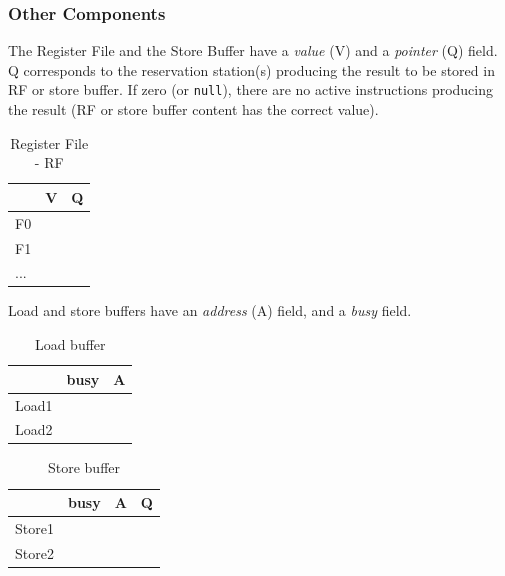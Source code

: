 \subsubsection{Other Components}
The Register File and the Store Buffer have a \textit{value} (V) and a \textit{pointer}
(Q) field.\\
Q corresponds to the reservation station(s) producing the result to be stored in RF or store buffer.
If zero (or \verb|null|), there are no active instructions producing the result (RF or store buffer content has the
correct value).
\begin{table}[H]
    \centering
    \begin{tabular}{l|ll}
        \textbf{} & \textbf{V} & \textbf{Q} \\
        \midrule
        F0 &  &  \\
        \midrule
        F1 &  &  \\
        \midrule
        ... &  &  \\
        \bottomrule
    \end{tabular}
    \caption{Register File - RF}
    \label{tab:register-file}
\end{table}

Load and store buffers have an \textit{address} (A) field, and a \textit{busy} field.

\begin{table}[H]
    \centering
    \begin{tabular}{l|ll}
        \textbf{} & \textbf{busy} & \textbf{A} \\
        \midrule
        Load1 &  &  \\
        \midrule
        Load2 &  &  \\
        \bottomrule
    \end{tabular}
    \caption{Load buffer}
    \label{tab:load-buffer}
\end{table}

\begin{table}[H]
    \centering
    \begin{tabular}{l|lll}
        \textbf{} & \textbf{busy} & \textbf{A} & \textbf{Q}\\
        \midrule
        Store1 &  &  &\\
        \midrule
        Store2 &  &  &\\
        \bottomrule
    \end{tabular}
    \caption{Store buffer}
    \label{tab:store-buffer}
\end{table}

